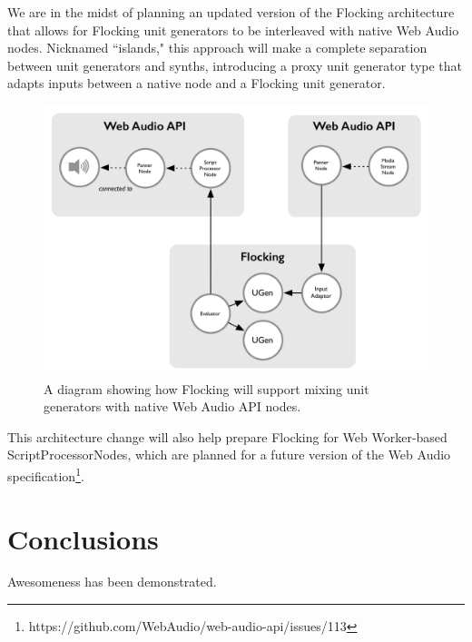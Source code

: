 \documentclass{article}
\begin{document}
We are in the midst of planning an updated version of the Flocking architecture that allows for Flocking unit generators to be interleaved with native Web Audio nodes. Nicknamed ``islands," this approach will make a complete separation between unit generators and synths, introducing a proxy unit generator type that adapts inputs between a native node and a Flocking unit generator.

\begin{figure}[ht]
\centering
\includegraphics[width=0.9\columnwidth]{images/flocking-web-audio-islands.png}
\caption{ A diagram showing how Flocking will support mixing unit generators with native Web Audio API nodes.\label{fig:graphical}}
\end{figure}

This architecture change will also help prepare Flocking for Web Worker-based ScriptProcessorNodes, which are planned for a future version of the Web Audio specification\footnote{https://github.com/WebAudio/web-audio-api/issues/113}.

\section{Conclusions}
Awesomeness has been demonstrated.

\nocite{*} %



\end{document}

